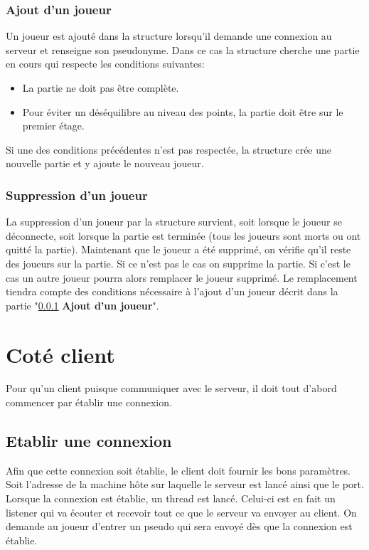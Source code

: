 \documentclass[a4paper,10pt]{article}
\begin{document}
	\subsubsection{Ajout d'un joueur}
	\label{subsubAddPlayer}
		Un joueur est ajouté dans la structure lorsqu'il demande une connexion au serveur et renseigne son pseudonyme. Dans ce cas la structure cherche une
partie en cours qui respecte les conditions suivantes:
		\begin{itemize}
			\item La partie ne doit pas être complète.
			\item Pour éviter un déséquilibre au niveau des points, la partie doit être sur le premier étage.
		\end{itemize}
		Si une des conditions précédentes n'est pas respectée, la structure crée une nouvelle partie et y ajoute le nouveau joueur.

	\subsubsection{Suppression d'un joueur}
		La suppression d'un joueur par la structure survient, soit lorsque le joueur se déconnecte, soit lorsque la partie est terminée (tous les joueurs sont
morts ou ont quitté la partie).
		Maintenant que le joueur a été supprimé, on vérifie qu'il reste des joueurs sur la partie. Si ce n'est pas le cas on supprime la partie. Si c'est le
cas un autre joueur pourra alors remplacer le joueur supprimé. Le remplacement tiendra compte des conditions nécessaire à l'ajout d'un joueur décrit dans la
partie "\ref{subsubAddPlayer} \textbf{Ajout d'un joueur}".


	\newpage
	\section{Coté client}
	Pour qu'un client puisque communiquer avec le serveur, il doit tout d'abord commencer par établir une connexion.

	\subsection{Etablir une connexion}
	Afin que cette connexion soit établie, le client doit fournir les bons paramètres. Soit l'adresse de la machine hôte sur laquelle le serveur est lancé
	ainsi	que le port. Lorsque la connexion est établie, un thread est lancé. Celui-ci est en fait un listener qui va écouter et recevoir tout ce que le
serveur	va	envoyer au client.
	On demande au joueur d'entrer un pseudo qui sera envoyé dès que la connexion est établie.
\end{document}

